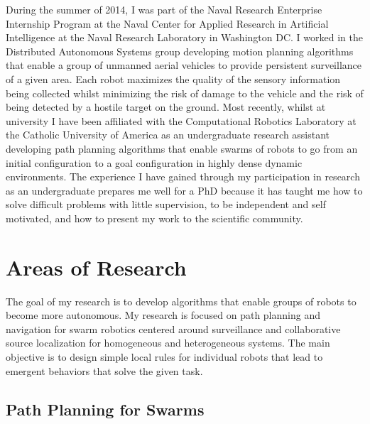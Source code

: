 \documentclass{article}
\begin{document}
During the summer of 2014, I was part of the Naval Research Enterprise
Internship Program at the Naval Center for Applied Research in Artificial
Intelligence at the Naval Research Laboratory in Washington DC. I worked in the
Distributed Autonomous Systems group developing motion planning algorithms that
enable a group of unmanned aerial vehicles to provide persistent surveillance
of a given area.  Each robot maximizes the quality of the sensory information
being collected whilst minimizing the risk of damage to the vehicle and the
risk of being detected by a hostile target on the ground.  Most recently,
whilst at university I have been affiliated with the Computational Robotics
Laboratory at the Catholic University of America as an undergraduate research
assistant developing path planning algorithms that enable swarms of robots to
go from an initial configuration to a goal configuration in highly dense
dynamic environments. The experience I have gained through my participation in research as
an undergraduate prepares me well for a PhD because it has taught me how to
solve difficult problems with little supervision, to be independent and self
motivated, and how to present my work to the scientific community.

\section{Areas of Research}

The goal of my research is to develop algorithms that enable groups of robots
to become more autonomous.  My research is focused on path planning and
navigation for swarm robotics centered around surveillance and collaborative
source localization for homogeneous and heterogeneous systems. The main
objective is to design simple local rules for individual robots that lead to
emergent behaviors that solve the given task.


\subsection{Path Planning for Swarms~\cite{crops, dcrops}}
\end{document}
